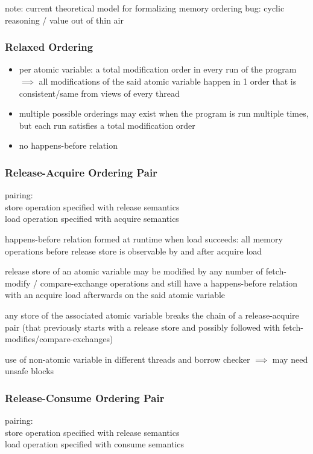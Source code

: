 \documentclass[8pt]{extarticle}
\begin{document}
\begin{multicols*}{2}
    note: current theoretical model for formalizing memory ordering bug: cyclic reasoning / value out of thin air

    \subsubsection{Relaxed Ordering}

    \begin{itemize}
    \item per atomic variable: a total modification order in every run of the program $\implies$ all modifications of the said atomic variable happen in 1 order that is consistent/same from views of every thread
    \item multiple possible orderings may exist when the program is run multiple times, but each run satisfies a total modification order
    \item no happens-before relation
    \end{itemize}

    \subsubsection{Release-Acquire Ordering Pair}
    pairing:\\
    store operation specified with release semantics\\
    load operation specified with acquire semantics

    happens-before relation formed at runtime when load succeeds: all memory operations before release store is observable by and after acquire load

    release store of an atomic variable may be modified by any number of fetch-modify / compare-exchange operations and still have a happens-before relation with an acquire load afterwards on the said atomic variable

    any store of the associated atomic variable breaks the chain of a release-acquire pair (that previously starts with a release store and possibly followed with fetch-modifies/compare-exchanges)

    use of non-atomic variable in different threads and borrow checker $\implies$ may need unsafe blocks
    
    \subsubsection{Release-Consume Ordering Pair}

    pairing:\\
    store operation specified with release semantics\\
    load operation specified with consume semantics


\end{multicols*}
\end{document}
